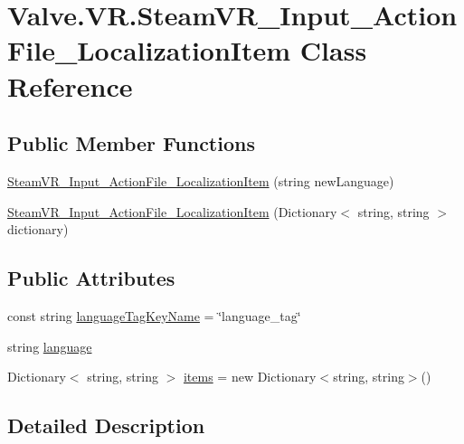 \hypertarget{class_valve_1_1_v_r_1_1_steam_v_r___input___action_file___localization_item}{}\section{Valve.\+V\+R.\+Steam\+V\+R\+\_\+\+Input\+\_\+\+Action\+File\+\_\+\+Localization\+Item Class Reference}
\label{class_valve_1_1_v_r_1_1_steam_v_r___input___action_file___localization_item}
\subsection*{Public Member Functions}
\begin{DoxyCompactItemize}
\item 
\mbox{\hyperlink{class_valve_1_1_v_r_1_1_steam_v_r___input___action_file___localization_item_a5318589813d3e09fa9b42f88b6ecde02}{Steam\+V\+R\+\_\+\+Input\+\_\+\+Action\+File\+\_\+\+Localization\+Item}} (string new\+Language)
\item 
\mbox{\hyperlink{class_valve_1_1_v_r_1_1_steam_v_r___input___action_file___localization_item_a1ec96fbd5e67e8e583b18b643012ca78}{Steam\+V\+R\+\_\+\+Input\+\_\+\+Action\+File\+\_\+\+Localization\+Item}} (Dictionary$<$ string, string $>$ dictionary)
\end{DoxyCompactItemize}
\subsection*{Public Attributes}
\begin{DoxyCompactItemize}
\item 
const string \mbox{\hyperlink{class_valve_1_1_v_r_1_1_steam_v_r___input___action_file___localization_item_af72f594ddd05655587eaa0691eeb66b0}{language\+Tag\+Key\+Name}} = \char`\"{}language\+\_\+tag\char`\"{}
\item 
string \mbox{\hyperlink{class_valve_1_1_v_r_1_1_steam_v_r___input___action_file___localization_item_a9cd20dc1ee348ef57fafa99d0d7e87b3}{language}}
\item 
Dictionary$<$ string, string $>$ \mbox{\hyperlink{class_valve_1_1_v_r_1_1_steam_v_r___input___action_file___localization_item_a1c0d2c5d790ae03c3a734b23ff38de72}{items}} = new Dictionary$<$string, string$>$()
\end{DoxyCompactItemize}


\subsection{Detailed Description}


